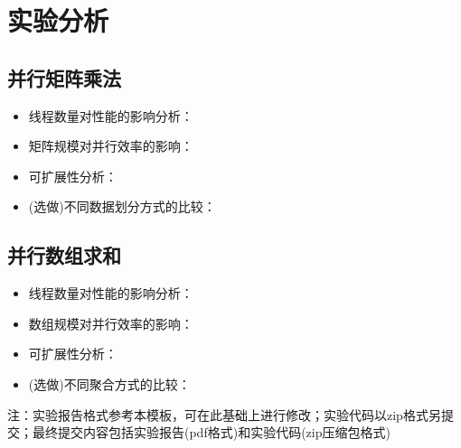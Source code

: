 \documentclass{SYSUReport}
\begin{document}
\section{实验分析}
\subsection{并行矩阵乘法}
\begin{itemize}
    \item 线程数量对性能的影响分析：
    \item 矩阵规模对并行效率的影响：
    \item 可扩展性分析：
    \item (选做)不同数据划分方式的比较：
\end{itemize}

\subsection{并行数组求和}
\begin{itemize}
    \item 线程数量对性能的影响分析：
    \item 数组规模对并行效率的影响：
    \item 可扩展性分析：
    \item (选做)不同聚合方式的比较：
\end{itemize}
注：实验报告格式参考本模板，可在此基础上进行修改；实验代码以zip格式另提交；最终提交内容包括实验报告(pdf格式)和实验代码(zip压缩包格式)
\end{document}

